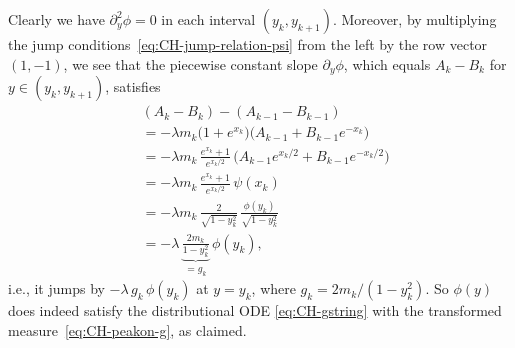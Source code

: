 \documentclass[10pt,a4paper]{article} \pdfoutput=1 
\begin{document}
Clearly we have $\partial_y^2 \phi = 0$ in each interval $(y_k,y_{k+1})$.
Moreover, by multiplying the jump conditions~\eqref{eq:CH-jump-relation-psi} from the left
by the row vector $(1,-1)$, we see that the piecewise constant slope $\partial_y \phi$,
which equals $A_k - B_k$ for $y \in (y_k,y_{k+1})$,
satisfies
\begin{equation*}
  \begin{split}
    &
    (A_k - B_k) - (A_{k-1} - B_{k-1})
    \\ &
    = - \lambda m_k \bigl( 1 + e^{x_k} \bigr) \bigl( A_{k-1} + B_{k-1} e^{-x_k} \bigr)
    \\ &
    = - \lambda m_k \, \frac{e^{x_k}+1}{e^{x_k/2}} \, \bigl( A_{k-1} e^{x_k/2} + B_{k-1} e^{-x_k/2} \bigr)
    \\ &
    = - \lambda m_k \, \frac{e^{x_k}+1}{e^{x_k/2}} \, \psi(x_k)
    \\ &
    = - \lambda m_k \, \frac{2}{\sqrt{1-y_k^2}} \, \frac{\phi(y_k)}{\sqrt{1-y_k^2}}
    \\ &
    = - \lambda \, \underbrace{\frac{2 m_k}{1-y_k^2}}_{=g_k} \, \phi(y_k)
    ,
  \end{split}
\end{equation*}
i.e., it jumps by $-\lambda \, g_k \, \phi(y_k)$ at $y=y_k$,
where $g_k = 2 m_k / (1-y_k^2)$.
So $\phi(y)$ does indeed satisfy the distributional ODE
\eqref{eq:CH-gstring} with the transformed measure~\eqref{eq:CH-peakon-g},
as claimed.
\end{document}
